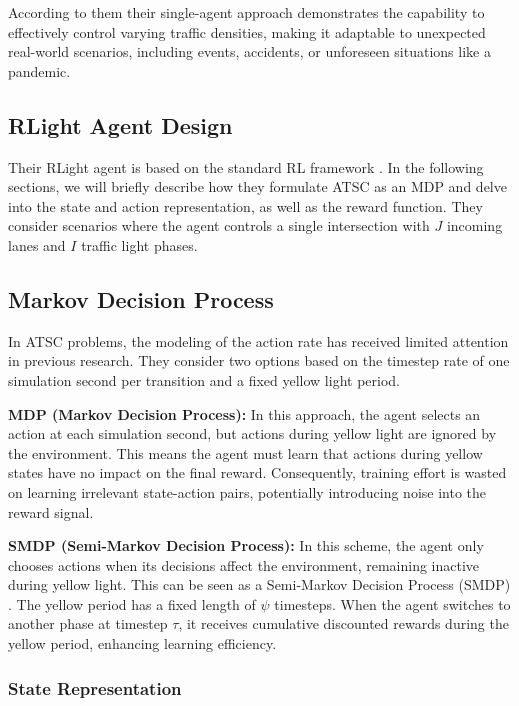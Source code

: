 According to them their single-agent approach demonstrates the capability to effectively control varying traffic densities, making it adaptable to unexpected real-world scenarios, including events, accidents, or unforeseen situations like a pandemic.

\subsection{RLight Agent Design}
\label{sec:rlight_agent_design}

Their RLight agent is based on the standard RL framework \cite{sutton2018reinforcement}. In the following sections, we will briefly describe how they formulate ATSC as an MDP and delve into the state and action representation, as well as the reward function. They consider scenarios where the agent controls a single intersection with \(J\) incoming lanes and \(I\) traffic light phases.

\subsection{Markov Decision Process}
\label{sec:mdp}

In ATSC problems, the modeling of the action rate has received limited attention in previous research. They consider two options based on the timestep rate of one simulation second per transition and a fixed yellow light period.

\textbf{MDP (Markov Decision Process):} In this approach, the agent selects an action at each simulation second, but actions during yellow light are ignored by the environment. This means the agent must learn that actions during yellow states have no impact on the final reward. Consequently, training effort is wasted on learning irrelevant state-action pairs, potentially introducing noise into the reward signal.

\textbf{SMDP (Semi-Markov Decision Process):} In this scheme, the agent only chooses actions when its decisions affect the environment, remaining inactive during yellow light. This can be seen as a Semi-Markov Decision Process (SMDP) \cite{sutton1999between}. The yellow period has a fixed length of \(\psi\) timesteps. When the agent switches to another phase at timestep \(\tau\), it receives cumulative discounted rewards during the yellow period, enhancing learning efficiency.

\subsubsection{State Representation}
\label{sec:state_representation}


